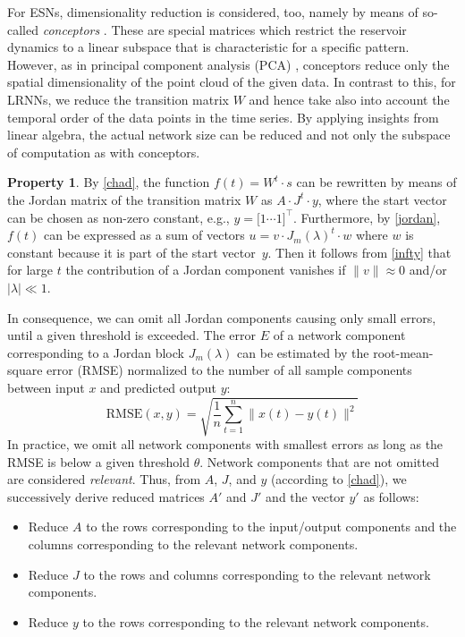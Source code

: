 \documentclass[twoside,11pt]{article}
\theoremstyle{definition}
\newtheorem{prop}{Property}
\begin{document}
For ESNs, dimensionality reduction is considered, too, namely by means of
so-called \emph{conceptors} \citep{Jae14,Jae17,KOS21b}. These are special matrices which
restrict the reservoir dynamics to a linear subspace that is characteristic for
a specific pattern. However, as in principal component analysis (PCA) \citep{Jol11}, conceptors
reduce only the spatial dimensionality of the point cloud of the given data. In
contrast to this, for LRNNs, we reduce the transition matrix $W$ and hence take
also into account the temporal order of the data points in the time series. By
applying insights from linear algebra, the actual network size can be reduced
and not only the subspace of computation as with conceptors.

\begin{prop}
By \cref{chad}, the function $f(t) = W^t \cdot s$ can be rewritten by
means of the Jordan matrix of the transition matrix $W$ as $A \cdot J^t
\cdot y$, where the start vector can be chosen as non-zero constant, e.g., $y =
\big[ 1 \cdots 1 \big]^\top$. Furthermore, by \cref{jordan}, $f(t)$ can be
expressed as a sum of vectors $u = v \cdot J_m(\lambda)^t \cdot w$ where $w$ is
constant because it is part of the start vector~$y$. Then it follows from
\cref{infty} that for large $t$ the contribution of a Jordan component
vanishes if $\|v\| \approx 0$ and/or $|\lambda| \ll 1$.

In consequence, we can omit all Jordan components causing only small errors,
until a given threshold is exceeded. The error $E$ of a network component
corresponding to a Jordan block $J_m(\lambda)$ can be estimated by the
root-mean-square error (RMSE) normalized to the number of all sample components
between input $x$ and predicted output $y$:
  \[ \mathrm{RMSE}(x,y) = \sqrt{\frac{1}{n} \sum_{t=1}^n \big\|x(t)-y(t)\big\|^2} \]
In practice, we omit all network components with smallest errors as long as the
RMSE is below a given threshold $\theta$. Network components that are not
omitted are considered \emph{relevant}. Thus, from $A$, $J$, and
$y$ (according to \cref{chad}), we successively derive reduced matrices
$A'$ and $J'$ and the vector $y'$ as follows:
\begin{itemize}
  \item Reduce $A$ to the rows corresponding to the input/output components and
	the columns corresponding to the relevant network components.
  \item Reduce $J$ to the rows and columns corresponding to the relevant
	network components.
  \item Reduce $y$ to the rows corresponding to the relevant network components.
\end{itemize}
\end{prop}
\end{document}

